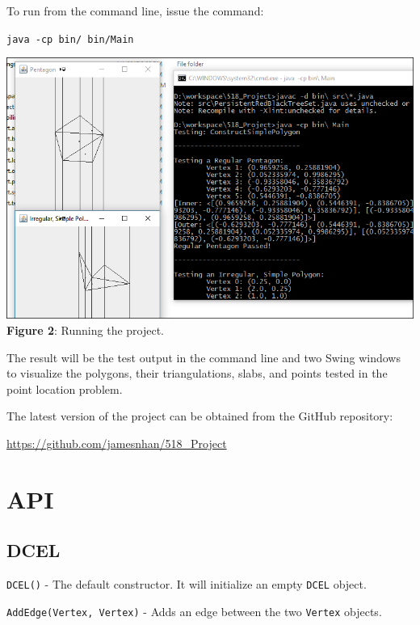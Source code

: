 \documentclass[11pt]{article}
\begin{document}
	To run from the command line, issue the command:
	
	\begin{center}
		\texttt{java -cp bin/ bin/Main}
	\end{center}
	
	\begin{center}
		\includegraphics[scale=0.5]{running} \\
		\textbf{Figure 2}: Running the project.
	\end{center}
	
	The result will be the test output in the command line and two Swing windows to visualize the polygons, their triangulations, slabs, and points tested in the point location problem.
	
	The latest version of the project can be obtained from the GitHub repository:
	
	\begin{center}
		\url{https://github.com/jamesnhan/518_Project}
	\end{center}
	
\section{API}
\label{sec:api}

\subsection{DCEL}
\label{sec:dcel}

	\texttt{DCEL()} - The default constructor. It will initialize an empty \texttt{DCEL} object.
	
	\texttt{AddEdge(Vertex, Vertex)} - Adds an edge between the two \texttt{Vertex} objects.
	
\end{document}
